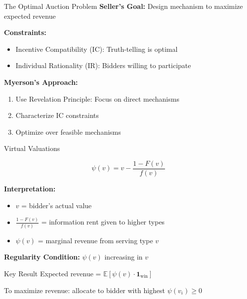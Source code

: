 \documentclass[xcolor={x11names}, aspectratio=169 ]{beamer}
\newcommand{\E}{\mathbb{E}}
\begin{document}
\begin{frame}{The Optimal Auction Problem}
\textbf{Seller's Goal:} Design mechanism to maximize expected revenue

\textbf{Constraints:}
\begin{itemize}
  \item Incentive Compatibility (IC): Truth-telling is optimal
  \item Individual Rationality (IR): Bidders willing to participate
\end{itemize}

\textbf{Myerson's Approach:}
\begin{enumerate}
  \item Use Revelation Principle: Focus on direct mechanisms
  \item Characterize IC constraints
  \item Optimize over feasible mechanisms
\end{enumerate}
\end{frame}

\begin{frame}{Virtual Valuations}
\begin{definition}
$$\psi(v) = v - \frac{1-F(v)}{f(v)}$$
\end{definition}

\textbf{Interpretation:}
\begin{itemize}
  \item $v$ = bidder's actual value
  \item $\frac{1-F(v)}{f(v)}$ = information rent given to higher types
  \item $\psi(v)$ = marginal revenue from serving type $v$
\end{itemize}

\textbf{Regularity Condition:} $\psi(v)$ increasing in $v$

\begin{alertblock}{Key Result}
Expected revenue = $\E[\psi(v) \cdot \mathbf{1}_{\text{win}}]$

To maximize revenue: allocate to bidder with highest $\psi(v_i) \geq 0$
\end{alertblock}
\end{frame}
\end{document}
